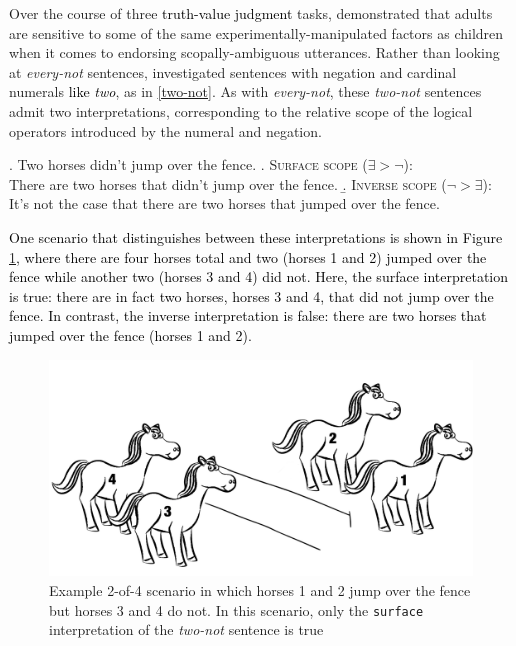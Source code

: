 \documentclass[cm]{glossa}
\newcommand{\lp}[1]{\textcolor{black}{#1}} %
\begin{document}
Over the course of three 
\lp{truth-value judgment}
tasks, \citet{musolinolidz2003} demonstrated that adults are sensitive to some of the same experimentally-manipulated factors as children when it comes to endorsing scopally-ambiguous utterances. Rather than looking at \emph{every-not} sentences, \citeauthor{musolinolidz2003} investigated sentences with negation and cardinal numerals \lp{like \textit{two}}, as in \ref{two-not}. As with \emph{every-not}, these \emph{two-not} sentences admit two interpretations, corresponding to the relative scope of the logical operators introduced by the numeral and negation.

\newpage

\ex. \label{two-not}
Two horses didn't jump over the fence.
\a. \textsc{Surface scope} ($\exists > \neg$):\\
There are two horses that didn't jump over the fence.
\b. \textsc{Inverse scope} ($\neg > \exists$):\\
It's not the case that there are two horses that jumped over the fence.

\lp{One scenario that distinguishes between these interpretations is shown in Figure \ref{2-of-4}, where there are four horses total and two (horses 1 and 2) jumped over the fence while another two (horses 3 and 4) did not.
Here, the {surface} interpretation is true: there are in fact two horses, horses 3 and 4, that did not jump over the fence.
In contrast, the {inverse} interpretation is false: there are two horses that jumped over the fence (horses 1 and 2).}

\begin{figure}
    \centering
    \includegraphics[width=4.5in]{2-of-4.png}
    \caption{Example 2-of-4 scenario in which horses 1 and 2 jump over the fence but horses 3 and 4 do not. In this scenario, only the \texttt{surface} interpretation of the \emph{two-not} sentence is true}
    \label{2-of-4}
\end{figure}
\end{document}
